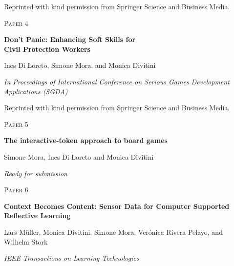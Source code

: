 \vspace{11cm}
\scriptsize Reprinted with kind permission from Springer Science and Business Media.

\cleardoublepage


\cleardoublepage
\begin{flushright}
\textsc{\huge Paper 4}
\end{flushright}
\vspace{3cm}
\begin{center}
	\begin{framed}
		{\Large \textbf{Don’t Panic: Enhancing Soft Skills for\\ Civil Protection Workers}}	
		\medskip
		
		Ines Di Loreto, Simone Mora, and Monica Divitini
		
		\medskip		
		\emph{In Proceedings of International Conference on Serious Games Development Applications (SGDA)}
	\end{framed}	
\end{center}

\vspace{11cm}
\scriptsize Reprinted with kind permission from Springer Science and Business Media.

\cleardoublepage


\cleardoublepage
\begin{flushright}
\textsc{\huge Paper 5}
\end{flushright}
\vspace{3cm}
\begin{center}
	\begin{framed}
		{\Large \textbf{The interactive-token approach to board games}}	
		\medskip
		
		Simone Mora, Ines Di Loreto and Monica Divitini
		
		\medskip		
		\emph{Ready for submission}
	\end{framed}	
\end{center}
\cleardoublepage


\cleardoublepage
\begin{flushright}
\textsc{\huge Paper 6}
\end{flushright}
\vspace{3cm}
\begin{center}
	\begin{framed}
		{\Large \textbf{Context Becomes Content: Sensor Data for Computer Supported Reflective Learning}}	
		\medskip
		
		Lars Müller, Monica Divitini, Simone Mora, Verónica Rivera-Pelayo, and Wilhelm Stork	
		
		\medskip		
		\emph{IEEE Transactions on Learning Technologies}
	\end{framed}	
\end{center}

